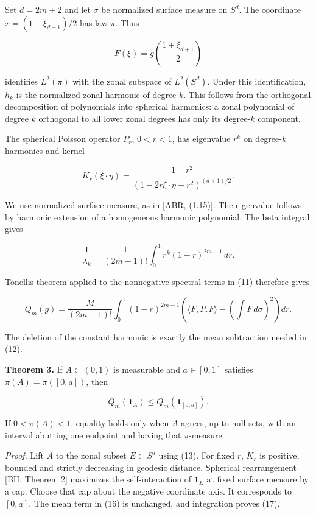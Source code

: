 \documentclass[11pt]{article}
\begin{document}
Set \(d=2m+2\) and let \(\sigma\) be normalized surface measure on
\(S^d\). The coordinate \(x=(1+\xi_{d+1})/2\) has law \(\pi\). Thus

\[
F(\xi)=g\!\left(\frac{1+\xi_{d+1}}2\right)
\tag{13}
\]

identifies \(L^2(\pi)\) with the zonal subspace of \(L^2(S^d)\). Under
this identification, \(h_k\) is the normalized zonal harmonic of degree
\(k\). This follows from the orthogonal decomposition of polynomials
into spherical harmonics: a zonal polynomial of degree \(k\) orthogonal
to all lower zonal degrees has only its degree-\(k\) component.

The spherical Poisson operator \(P_r\), \(0<r<1\), has eigenvalue
\(r^k\) on degree-\(k\) harmonics and kernel

\[
K_r(\xi\cdot\eta)
=\frac{1-r^2}{(1-2r\xi\cdot\eta+r^2)^{(d+1)/2}}.
\tag{14}
\]

We use normalized surface measure, as in {[}ABR, (1.15){]}. The
eigenvalue follows by harmonic extension of a homogeneous harmonic
polynomial. The beta integral gives

\[
\frac1{\lambda_k}
=\frac1{(2m-1)!}\int_0^1r^k(1-r)^{2m-1}\,dr.
\tag{15}
\]

Tonelli\textquotesingle s theorem applied to the nonnegative spectral
terms in (11) therefore gives

\[
Q_m(g)=\frac{M}{(2m-1)!}\int_0^1(1-r)^{2m-1}
\left(\langle F,P_rF\rangle-\left(\int F\,d\sigma\right)^2\right)dr.
\tag{16}
\]

The deletion of the constant harmonic is exactly the mean subtraction
needed in (12).

\textbf{Theorem 3.} If \(A\subset(0,1)\) is measurable and \(a\in[0,1]\)
satisfies \(\pi(A)=\pi([0,a])\), then

\[
Q_m(\mathbf1_A)\le Q_m(\mathbf1_{[0,a]}).
\tag{17}
\]

If \(0<\pi(A)<1\), equality holds only when \(A\) agrees, up to null
sets, with an interval abutting one endpoint and having that
\(\pi\)-measure.

\emph{Proof.} Lift \(A\) to the zonal subset \(E\subset S^d\) using
(13). For fixed \(r\), \(K_r\) is positive, bounded and strictly
decreasing in geodesic distance. Spherical rearrangement {[}BH, Theorem
2{]} maximizes the self-interaction of \(\mathbf1_E\) at fixed surface
measure by a cap. Choose that cap about the negative coordinate axis. It
corresponds to \([0,a]\). The mean term in (16) is unchanged, and
integration proves (17).
\end{document}
